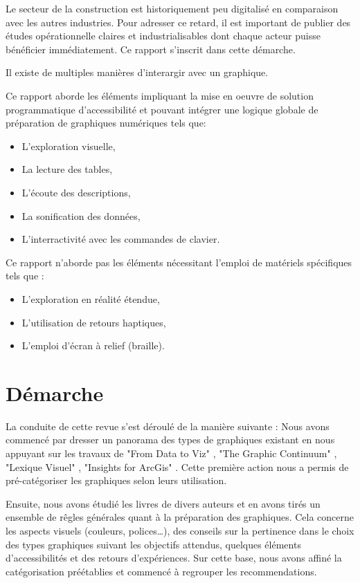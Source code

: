 \documentclass[a4paper,12pt]{article}
\begin{document}
\begin{multicols}{2}
Le secteur de la construction est historiquement peu digitalisé en comparaison avec les autres industries.\autocite{safurazabidinBibliometricScientometricMapping2020} Pour adresser ce retard, il est important de publier des études opérationnelle claires et industrialisables dont chaque acteur puisse bénéficier immédiatement. Ce rapport s'inscrit dans cette démarche.


Il existe de multiples manières d'interargir avec un graphique. \autocite{schwabishCenteringAccessibilityData2022a,frankelavskyRightToolsJob2022}

Ce rapport aborde les éléments impliquant la mise en oeuvre de solution programmatique d'accessibilité et pouvant intégrer une logique globale de préparation de graphiques numériques tels que:
\begin{itemize}
\item L'exploration visuelle,
\item La lecture des tables,
\item L'écoute des descriptions,
\item La sonification des données,
\item L'interractivité avec les commandes de clavier.
\end{itemize}

Ce rapport n'aborde pas les éléments nécessitant l'emploi de matériels spécifiques tels que :
\begin{itemize}
\item L'exploration en réalité étendue,
\item L'utilisation de retours haptiques,
\item L'emploi d'écran à relief (braille).
\end{itemize}
\section*{Démarche}
\label{sec:org0a9b303}
La conduite de cette revue s'est déroulé de la manière suivante :
Nous avons commencé par dresser un panorama des types de graphiques existant en nous appuyant sur les travaux de "From Data to Viz" \autocite{yanholtzDataViz2018}, "The Graphic Continuum" \autocite{jonathanschwabishGraphicContinuum2014}, "Lexique Visuel" \autocite{alansmithLexiqueVisuel}, "Insights for ArcGis" \autocite{lindabealeInsightsArcGIS2017}.
Cette première action nous a permis de pré-catégoriser les graphiques selon leurs utilisation.

Ensuite, nous avons étudié les livres de divers auteurs et en avons tirés un ensemble de rêgles générales quant à la préparation des graphiques. Cela concerne les aspects visuels (couleurs, polices\ldots{}), des conseils sur la pertinence dans le choix des types graphiques suivant les objectifs attendus, quelques éléments d'accessibilités et des retours d'expériences. Sur cette base, nous avons affiné la catégorisation préétablies et commencé à regrouper les recommendations.


\end{multicols}
\end{document}
